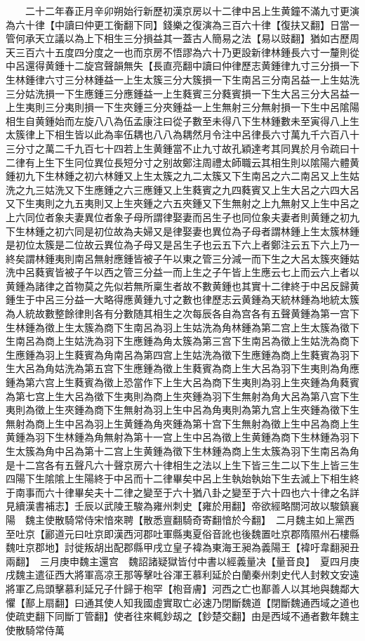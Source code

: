 　　二十二年春正月辛卯朔始行新歷初漢京房以十二律中呂上生黄鐘不滿九寸更演為六十律【中讀曰仲更工衡翻下同】錢樂之復演為三百六十律【復扶又翻】日當一管何承天立議以為上下相生三分損益其一蓋古人簡易之法【易以豉翻】猶如古歷周天三百六十五度四分度之一也而京房不悟謬為六十乃更設新律林鍾長六寸一釐則從中呂還得黄鍾十二旋宫聲韻無失【長直亮翻中讀曰仲律歷志黄鍾律九寸三分損一下生林鍾律六寸三分林鍾益一上生太簇三分大簇損一下生南呂三分南呂益一上生姑洗三分姑洗損一下生應鍾三分應鍾益一上生蕤賓三分蕤賓損一下生大呂三分大呂益一上生夷則三分夷則損一下生夾鍾三分夾鍾益一上生無射三分無射損一下生中呂隂陽相生自黄鍾始而左旋八八為伍孟康注曰從子數至未得八下生林鍾數未至寅得八上生太簇律上下相生皆以此為率伍耦也八八為耦然月令注中呂律長六寸萬九千六百八十三分寸之萬二千九百七十四若上生黄鍾當不止九寸故孔穎達考其同異於月令疏曰十二律有上生下生冋位異位長短分寸之别故鄭注周禮太師職云其相生則以隂陽六體黄鍾初九下生林鍾之初六林鍾又上生太簇之九二太簇又下生南呂之六二南呂又上生姑洗之九三姑洗又下生應鍾之六三應鍾又上生蕤賓之九四蕤賓又上生大呂之六四大呂又下生夷則之九五夷則又上生夾鍾之六五夾鍾又下生無射之上九無射又上生中呂之上六同位者象夫妻異位者象子母所謂律娶妻而呂生子也同位象夫妻者則黄鍾之初九下生林鍾之初六同是初位故為夫婦又是律娶妻也異位為子母者謂林鍾上生太簇林鍾是初位太簇是二位故云異位為子母又是呂生子也云五下六上者鄭注云五下六上乃一終矣謂林鍾夷則南呂無射應鍾皆被子午以東之管三分減一而下生之大呂太簇夾鍾姑洗中呂蕤賓皆被子午以西之管三分益一而上生之子午皆上生應云七上而云六上者以黄鍾為諸律之首物莫之先似若無所稟生者故不數黄鍾也其實十二律終于中呂反歸黄鍾生于中呂三分益一大略得應黄鍾九寸之數也律歷志云黄鍾為天統林鍾為地統太簇為人統故數整餘律則各有分數随其相生之次每辰各自為宫各有五聲黄鍾為第一宫下生林鍾為徵上生太簇為商下生南呂為羽上生姑洗為角林鍾為第二宫上生太簇為徵下生南呂為商上生姑洗為羽下生應鍾為角太簇為第三宫下生南呂為徵上生姑洗為商下生應鍾為羽上生蕤賓為角南呂為第四宫上生姑洗為徵下生應鍾為商上生蕤賓為羽下生大呂為角姑洗為第五宫下生應鍾為徵上生蕤賓為商上生大呂為羽下生夷則為角應鍾為第六宫上生蕤賓為徵上恐當作下上生大呂為商下生夷則為羽上生夾鍾為角蕤賓為第七宫上生大呂為徵下生夷則為商上生夾鍾為羽下生無射為角大呂為第八宫下生夷則為徵上生夾鍾為商下生無射為羽上生中呂為角夷則為第九宫上生夾鍾為徵下生無射為商上生中呂為羽上生黄鍾為角夾鍾為第十宫下生無射為徵上生中呂為商上生黄鍾為羽下生林鍾為角無射為第十一宫上生中呂為徵上生黄鍾為商下生林鍾為羽下生太簇為角中呂為第十二宫上生黄鍾為徵下生林鍾為商上生太簇為羽下生南呂為角是十二宫各有五聲凡六十聲京房六十律相生之法以上生下皆三生二以下生上皆三生四陽下生隂隂上生陽終于中呂而十二律畢矣中呂上生執始執始下生去滅上下相生終于南事而六十律畢矣夫十二律之變至于六十猶八卦之變至于六十四也六十律之名詳見續漢書補志】壬辰以武陵王駿為雍州刺史【雍於用翻】帝欲經略關河故以駿鎮襄陽　魏主使散騎常侍宋愔來聘【散悉亶翻騎奇寄翻愔於今翻】　二月魏主如上黨西至吐京【酈道元曰吐京即漢西河郡吐軍縣夷夏俗音訛也後魏置吐京郡隋隰州石樓縣魏吐京郡地】討徙叛胡出配郡縣甲戌立皇子褘為東海王昶為義陽王【褘吁韋翻昶丑兩翻】　三月庚申魏主還宫　魏詔諸疑獄皆付中書以經義量决【量音良】　夏四月庚戌魏主遣征西大將軍高凉王那等擊吐谷渾王慕利延於白蘭秦州刺史代人封敕文安遠將軍乙烏頭擊慕利延兄子什歸于枹罕【枹音膚】河西之亡也鄯善人以其地與魏鄰大懼【鄯上扇翻】曰通其使人知我國虛實取亡必速乃閉斷魏道【閉斷魏通西域之道也使疏吏翻下同斷丁管翻】使者往來輒鈔刼之【鈔楚交翻】由是西域不通者數年魏主使散騎常侍萬